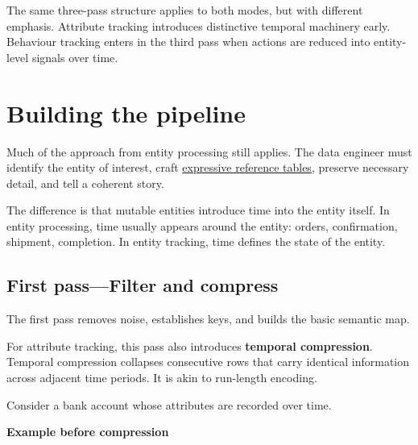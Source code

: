 \documentclass[10pt,openany,10pt]{book}
\begin{document}
The same three-pass structure applies to both modes, but with different
emphasis. Attribute tracking introduces distinctive temporal machinery
early. Behaviour tracking enters in the third pass when actions are
reduced into entity-level signals over time.

\section{Building the pipeline}\label{building-the-pipeline-1}

Much of the approach from entity processing still applies. The data
engineer must identify the entity of interest, craft
\hyperref[docs-creating-information-reference-data]{expressive reference
tables}, preserve necessary detail, and tell a coherent story.

The difference is that mutable entities introduce time into the entity
itself. In entity processing, time usually appears around the entity:
orders, confirmation, shipment, completion. In entity tracking, time
defines the state of the entity.

\subsection{First pass---Filter and
compress}\label{first-passfilter-and-compress}

The first pass removes noise, establishes keys, and builds the basic
semantic map.

For attribute tracking, this pass also introduces \textbf{temporal
compression}. Temporal compression collapses consecutive rows that carry
identical information across adjacent time periods. It is akin to
run-length encoding.

Consider a bank account whose attributes are recorded over time.

\textbf{Example before compression}
\end{document}
